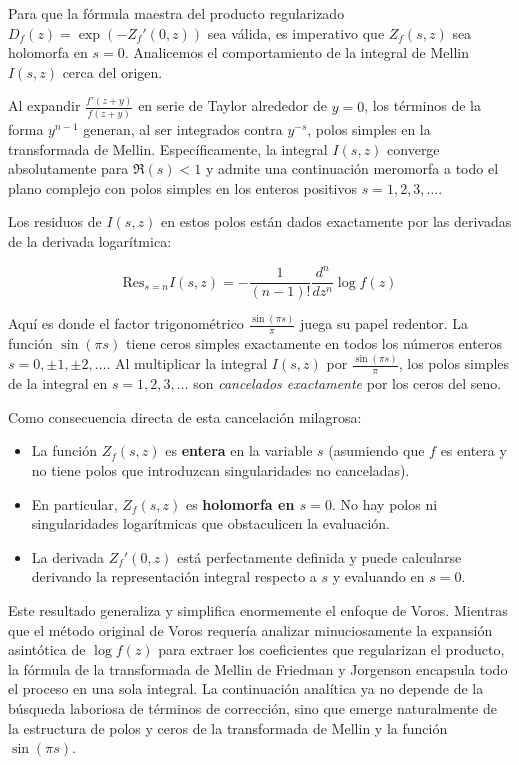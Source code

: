 Para que la fórmula maestra del producto regularizado $D_f(z) = \exp(-Z_f'(0, z))$ sea válida, es imperativo que $Z_f(s, z)$ sea holomorfa en $s=0$. Analicemos el comportamiento de la integral de Mellin $I(s, z)$ cerca del origen.

Al expandir $\frac{f'(z+y)}{f(z+y)}$ en serie de Taylor alrededor de $y=0$, los términos de la forma $y^{n-1}$ generan, al ser integrados contra $y^{-s}$, polos simples en la transformada de Mellin. Específicamente, la integral $I(s, z)$ converge absolutamente para $\Re(s) < 1$ y admite una continuación meromorfa a todo el plano complejo con polos simples en los enteros positivos $s = 1, 2, 3, \dots$. 

Los residuos de $I(s, z)$ en estos polos están dados exactamente por las derivadas de la derivada logarítmica:

$$ \text{Res}_{s=n} I(s, z) = -\frac{1}{(n-1)!} \frac{d^n}{dz^n} \log f(z) $$

Aquí es donde el factor trigonométrico $\frac{\sin(\pi s)}{\pi}$ juega su papel redentor. La función $\sin(\pi s)$ tiene ceros simples exactamente en todos los números enteros $s = 0, \pm 1, \pm 2, \dots$. Al multiplicar la integral $I(s, z)$ por $\frac{\sin(\pi s)}{\pi}$, los polos simples de la integral en $s = 1, 2, 3, \dots$ son \textit{cancelados exactamente} por los ceros del seno.

Como consecuencia directa de esta cancelación milagrosa:

\begin{itemize}
    \item La función $Z_f(s, z)$ es \textbf{entera} en la variable $s$ (asumiendo que $f$ es entera y no tiene polos que introduzcan singularidades no canceladas).
    \item En particular, $Z_f(s, z)$ es \textbf{holomorfa en $s=0$}. No hay polos ni singularidades logarítmicas que obstaculicen la evaluación.
    \item La derivada $Z_f'(0, z)$ está perfectamente definida y puede calcularse derivando la representación integral respecto a $s$ y evaluando en $s=0$.
\end{itemize}

Este resultado generaliza y simplifica enormemente el enfoque de Voros. Mientras que el método original de Voros requería analizar minuciosamente la expansión asintótica de $\log f(z)$ para extraer los coeficientes que regularizan el producto, la fórmula de la transformada de Mellin de Friedman y Jorgenson encapsula todo el proceso en una sola integral. La continuación analítica ya no depende de la búsqueda laboriosa de términos de corrección, sino que emerge naturalmente de la estructura de polos y ceros de la transformada de Mellin y la función $\sin(\pi s)$.

